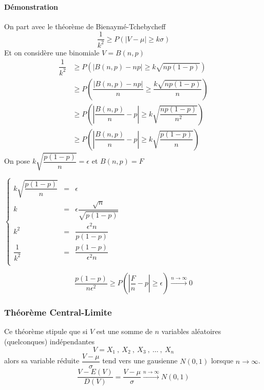\paragraph{Démonstration}
On part avec le théorème de Bienaymé-Tchebycheff
$$\dfrac{1}{k^2} \geq P(|V-\mu|\geq k\sigma)$$
Et on considère une binomiale $V = B(n,p)$
\begin{align*}
	\dfrac{1}{k^2} &\geq P\left(\left|B(n,p)-np\right|\geq k\sqrt{np(1-p)}\right)\\
                   &\geq P\left(\dfrac{\left|B(n,p)-np\right|}{n}\geq \dfrac{k\sqrt{np(1-p)}}{n}\right)\\
                   &\geq P\left(\left|\dfrac{B(n,p)}{n}-p\right|\geq k\sqrt{\dfrac{np(1-p)}{n^2}}\right)\\
                   &\geq P\left(\left|\dfrac{B(n,p)}{n}-p\right|\geq k\sqrt{\dfrac{p(1-p)}{n}}\right)
\end{align*}
On pose $k\sqrt{\dfrac{p(1-p)}{n}} = \epsilon$ et $B(n,p) = F$
\begin{center}
	$\left\{\begin{array}{LLL}
		k\sqrt{\dfrac{p(1-p)}{n}}&=&\epsilon\\
		k&=&\epsilon\dfrac{\sqrt{n}}{\sqrt{p(1-p)}}\\
		k^2&=&\dfrac{\epsilon^2n}{p(1-p)}\\
		\dfrac{1}{k^2}&=&\dfrac{p(1-p)}{\epsilon^2n}\\
	\end{array}\right.$
\end{center}
$$\boxed{\dfrac{p(1-p)}{n\epsilon^2} \geq P\left(\left|\dfrac{F}{n}-p\right|\geq\epsilon\right) \stackrel{n\rightarrow\infty}{\rightarrow} 0}$$







\newpage
\subsubsection{Théorème Central-Limite}
Ce théorème stipule que si $V$ est une somme de $n$ variables aléatoires (quelconques) indépendantes
$$V = X_1\ ,\ X_2\ ,\ X_3\ ,\ \dots\ ,\ X_n$$
alors sa variable réduite $\dfrac{V-\mu}{\sigma}$ tend vers une gausienne $N(0,1)$ lorsque $n\rightarrow\infty$.
$$\boxed{\dfrac{V-E(V)}{D(V)} = \dfrac{V-\mu}{\sigma} \stackrel{n\rightarrow\infty}{\rightarrow} N(0,1)}$$
